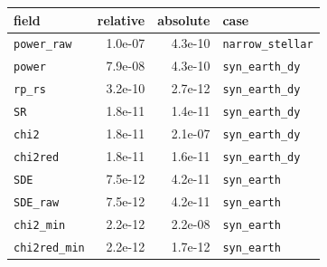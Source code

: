 \begin{tabular}{lrrl}
\toprule
field & relative & absolute & case \\
\midrule
\texttt{power\_raw} & 1.0e-07 & 4.3e-10 & \texttt{narrow\_stellar} \\
\texttt{power} & 7.9e-08 & 4.3e-10 & \texttt{syn\_earth\_dy} \\
\texttt{rp\_rs} & 3.2e-10 & 2.7e-12 & \texttt{syn\_earth\_dy} \\
\texttt{SR} & 1.8e-11 & 1.4e-11 & \texttt{syn\_earth\_dy} \\
\texttt{chi2} & 1.8e-11 & 2.1e-07 & \texttt{syn\_earth\_dy} \\
\texttt{chi2red} & 1.8e-11 & 1.6e-11 & \texttt{syn\_earth\_dy} \\
\texttt{SDE} & 7.5e-12 & 4.2e-11 & \texttt{syn\_earth} \\
\texttt{SDE\_raw} & 7.5e-12 & 4.2e-11 & \texttt{syn\_earth} \\
\texttt{chi2\_min} & 2.2e-12 & 2.2e-08 & \texttt{syn\_earth} \\
\texttt{chi2red\_min} & 2.2e-12 & 1.7e-12 & \texttt{syn\_earth} \\
\bottomrule
\end{tabular}
